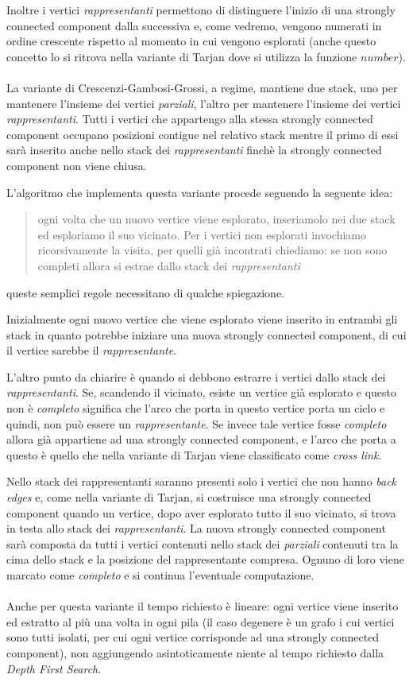 Inoltre i vertici \emph{rappresentanti} permettono di distinguere
l'inizio di una strongly connected component dalla successiva e, come
vedremo, vengono numerati in ordine crescente rispetto al momento in
cui vengono esplorati (anche questo concetto lo si ritrova nella
variante di Tarjan dove si utilizza la funzione $number$).
\\\\
La variante di Crescenzi-Gambosi-Grossi, a regime, mantiene due stack,
uno per mantenere l'insieme dei vertici \emph{parziali}, l'altro per
mantenere l'insieme dei vertici \emph{rappresentanti}. Tutti i vertici
che appartengo alla stessa strongly connected component occupano
posizioni contigue nel relativo stack mentre il primo di essi sar\`a
inserito anche nello stack dei \emph{rappresentanti} finch\`e la
strongly connected component non viene chiusa.

L'algoritmo che implementa questa variante procede seguendo la
seguente idea:
\begin{quotation}
  ogni volta che un nuovo vertice viene esplorato, inseriamolo nei due
  stack ed esploriamo il suo vicinato. Per i vertici non esplorati
  invochiamo ricorsivamente la visita, per quelli gi\`a incontrati
  chiediamo: se non sono completi allora si estrae dallo stack dei
  \emph{rappresentanti}
\end{quotation}
queste semplici regole necessitano di qualche
spiegazione. 

Inizialmente ogni nuovo vertice che viene esplorato viene
inserito in entrambi gli stack in quanto potrebbe iniziare una nuova
strongly connected component, di cui il vertice sarebbe il
\emph{rappresentante}. 

L'altro punto da chiarire \`e quando si debbono estrarre i vertici
dallo stack dei \emph{rappresentanti}. Se, scandendo il vicinato,
esiste un vertice gi\`a esplorato e questo non \`e \emph{completo}
significa che l'arco che porta in questo vertice porta un ciclo e
quindi, non pu\`o essere un \emph{rappresentante}. Se invece tale
vertice fosse \emph{completo} allora gi\`a appartiene ad una strongly
connected component, e l'arco che porta a questo \`e quello che nella
variante di Tarjan viene classificato come \emph{cross link}.

Nello stack dei rappresentanti saranno presenti solo i vertici che non
hanno \emph{back edges} e, come nella variante di Tarjan, si
costruisce una strongly connected component quando un vertice, dopo
aver esplorato tutto il suo vicinato, si trova in testa allo stack dei
\emph{rappresentanti}. La nuova strongly connected component sar\`a
composta da tutti i vertici contenuti nello stack dei \emph{parziali}
contenuti tra la cima dello stack e la posizione del rappresentante
compresa. Ognuno di loro viene marcato come \emph{completo} e si
continua l'eventuale computazione.
\\\\
Anche per questa variante il tempo richiesto \`e lineare: ogni vertice
viene inserito ed estratto al pi\`u una volta in ogni pila (il caso
degenere \`e un grafo i cui vertici sono tutti isolati, per cui ogni
vertice corrisponde ad una strongly connected component), non
aggiungendo asintoticamente niente al tempo richiesto dalla
\emph{Depth First Search}.
